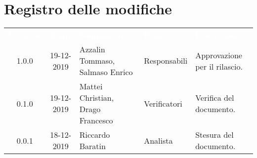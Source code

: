 \section*{Registro delle modifiche}
{
\renewcommand{\arraystretch}{1.5}
\centering
\begin{longtable}{ c c  C{4cm}  C{3cm} C{4cm}}
\textcolor{white}{\textbf{Versione}} & \textcolor{white}{\textbf{Data}} & \textcolor{white}{\textbf{Nominativo}} & \textcolor{white}{\textbf{Ruolo}} & \textcolor{white}{\textbf{Descrizione}}\\	


1.0.0 & 19-12-2019 & Azzalin Tommaso, Salmaso Enrico & Responsabili & Approvazione per il rilascio.  \\
        
0.1.0 & 19-12-2019 & Mattei Christian, Drago Francesco & Verificatori & Verifica del documento.  \\
		
0.0.1 & 18-12-2019 & Riccardo Baratin & Analista & Stesura del documento.  \\
		
		
\end{longtable}
}